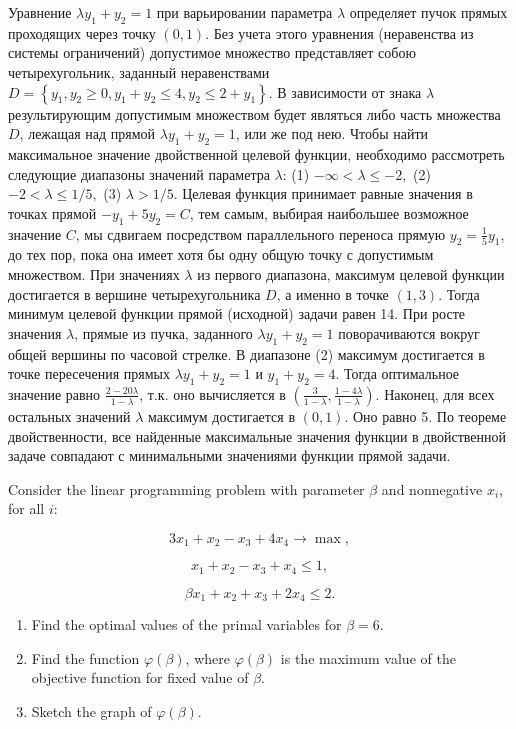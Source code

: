 \begin{solution}
Уравнение $\lambda y_{1} +y_{2} =1$ при варьировании параметра $\lambda $ определяет пучок прямых проходящих через точку $(0,1)$. Без учета этого уравнения (неравенства из системы ограничений) допустимое множество представляет собою четырехугольник, заданный неравенствами $D=\left\{y_{1} ,y_{2} \ge 0,y_{1} +y_{2} \le 4,y_{2} \le 2+y_{1} \right\}$. В зависимости от знака $\lambda $ результирующим допустимым множеством будет являться либо часть множества $D$, лежащая над прямой $\lambda y_{1} +y_{2} =1$, или же под нею. Чтобы найти максимальное значение двойственной целевой функции, необходимо рассмотреть следующие диапазоны значений параметра $\lambda $: (1) $-\infty <\lambda \le -2,$ (2) $-2<\lambda \le 1/5,$ (3) $\lambda >1/5.$ Целевая функция принимает равные значения в точках прямой $-y_{1} +5y_{2} =C$, тем самым, выбирая наибольшее возможное значение $C$, мы сдвигаем посредством параллельного переноса прямую $y_{2} =\frac{1}{5} y_{1} $, до тех пор, пока она имеет хотя бы одну общую точку с допустимым множеством. При значениях $\lambda $ из первого диапазона, максимум целевой функции достигается в вершине четырехугольника $D$, а именно в точке $(1,3)$. Тогда минимум целевой функции прямой (исходной) задачи равен 14. При росте значения $\lambda $, прямые из пучка, заданного $\lambda y_{1} +y_{2} =1$ поворачиваются вокруг общей вершины по часовой стрелке. В диапазоне (2) максимум достигается в точке пересечения прямых $\lambda y_{1} +y_{2} =1$ и $y_{1} +y_{2} =4$. Тогда оптимальное значение  равно $\frac{2-20\lambda }{1-\lambda } $, т.к. оно вычисляется в $(\frac{3}{1-\lambda } ,  \frac{1-4\lambda }{1-\lambda } )$. Наконец, для всех остальных значений $\lambda $ максимум достигается в $(0,1).$ Оно равно 5. По теореме двойственности, все найденные максимальные значения функции в двойственной задаче совпадают с минимальными значениями функции прямой задачи.
\end{solution}

\begin{problem}
Consider the linear programming problem with parameter $\beta $ and nonnegative $x_{i} $, for all $i$:

\[3x_{1} +x_{2} -x_{3} +4x_{4} \to \max ,\] 

\[x_{1} +x_{2} -x_{3} +x_{4} \le 1,\] 

\[\beta x_{1} +x_{2} +x_{3} +2x_{4} \le 2.\] 

\begin{enumerate}
\item  Find the optimal values of the primal variables for $\beta =6$.

\item  Find the function $\varphi (\beta )$, where $\varphi (\beta )$ is the maximum value of the objective function for fixed value of $\beta $.

\item  Sketch the graph of $\varphi (\beta )$.
\end{enumerate}
\end{problem}


